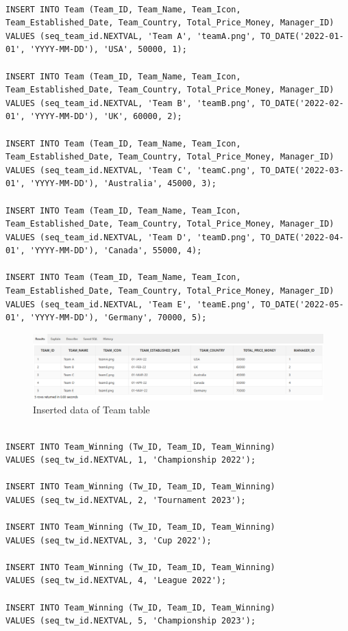 \begin{lstlisting}[caption={Inserting data into Team tables},label={lst:insert_team}]

INSERT INTO Team (Team_ID, Team_Name, Team_Icon, Team_Established_Date, Team_Country, Total_Price_Money, Manager_ID)
VALUES (seq_team_id.NEXTVAL, 'Team A', 'teamA.png', TO_DATE('2022-01-01', 'YYYY-MM-DD'), 'USA', 50000, 1);

INSERT INTO Team (Team_ID, Team_Name, Team_Icon, Team_Established_Date, Team_Country, Total_Price_Money, Manager_ID)
VALUES (seq_team_id.NEXTVAL, 'Team B', 'teamB.png', TO_DATE('2022-02-01', 'YYYY-MM-DD'), 'UK', 60000, 2);

INSERT INTO Team (Team_ID, Team_Name, Team_Icon, Team_Established_Date, Team_Country, Total_Price_Money, Manager_ID)
VALUES (seq_team_id.NEXTVAL, 'Team C', 'teamC.png', TO_DATE('2022-03-01', 'YYYY-MM-DD'), 'Australia', 45000, 3);

INSERT INTO Team (Team_ID, Team_Name, Team_Icon, Team_Established_Date, Team_Country, Total_Price_Money, Manager_ID)
VALUES (seq_team_id.NEXTVAL, 'Team D', 'teamD.png', TO_DATE('2022-04-01', 'YYYY-MM-DD'), 'Canada', 55000, 4);

INSERT INTO Team (Team_ID, Team_Name, Team_Icon, Team_Established_Date, Team_Country, Total_Price_Money, Manager_ID)
VALUES (seq_team_id.NEXTVAL, 'Team E', 'teamE.png', TO_DATE('2022-05-01', 'YYYY-MM-DD'), 'Germany', 70000, 5);
\end{lstlisting}
\begin{figure}[H]
    \centering
    \includegraphics[width=1\textwidth]{images/TableData/TEAM.png}
    \caption{Inserted data of Team table}
\end{figure}

\begin{lstlisting}[caption={Inserting data into Team\_Winning tables},label={lst:insert_Team_Winning}]

INSERT INTO Team_Winning (Tw_ID, Team_ID, Team_Winning)
VALUES (seq_tw_id.NEXTVAL, 1, 'Championship 2022');

INSERT INTO Team_Winning (Tw_ID, Team_ID, Team_Winning)
VALUES (seq_tw_id.NEXTVAL, 2, 'Tournament 2023');

INSERT INTO Team_Winning (Tw_ID, Team_ID, Team_Winning)
VALUES (seq_tw_id.NEXTVAL, 3, 'Cup 2022');

INSERT INTO Team_Winning (Tw_ID, Team_ID, Team_Winning)
VALUES (seq_tw_id.NEXTVAL, 4, 'League 2022');

INSERT INTO Team_Winning (Tw_ID, Team_ID, Team_Winning)
VALUES (seq_tw_id.NEXTVAL, 5, 'Championship 2023');
\end{lstlisting}


